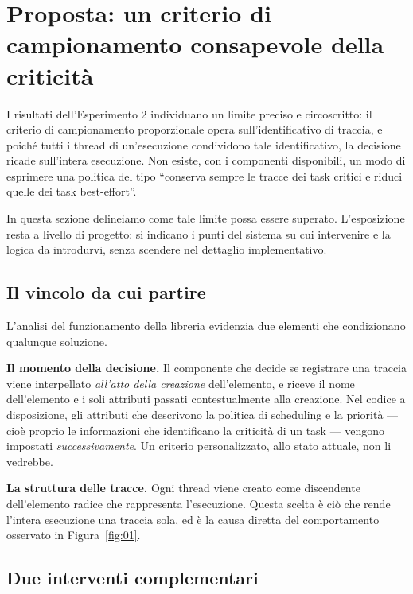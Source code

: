
\section{Proposta: un criterio di campionamento consapevole della criticit\`a}

I risultati dell'Esperimento 2 individuano un limite preciso e circoscritto: il criterio di
campionamento proporzionale opera sull'identificativo di traccia, e poich\'e tutti i thread di
un'esecuzione condividono tale identificativo, la decisione ricade sull'intera esecuzione. Non
esiste, con i componenti disponibili, un modo di esprimere una politica del tipo ``conserva sempre
le tracce dei task critici e riduci quelle dei task best-effort''.

In questa sezione delineiamo come tale limite possa essere superato. L'esposizione resta a livello
di progetto: si indicano i punti del sistema su cui intervenire e la logica da introdurvi, senza
scendere nel dettaglio implementativo.

\subsection{Il vincolo da cui partire}

L'analisi del funzionamento della libreria evidenzia due elementi che condizionano qualunque
soluzione.

\textbf{Il momento della decisione.} Il componente che decide se registrare una traccia viene
interpellato \emph{all'atto della creazione} dell'elemento, e riceve il nome dell'elemento e i soli
attributi passati contestualmente alla creazione. Nel codice a disposizione, gli attributi che
descrivono la politica di scheduling e la priorit\`a --- cio\`e proprio le informazioni che
identificano la criticit\`a di un task --- vengono impostati \emph{successivamente}. Un criterio
personalizzato, allo stato attuale, non li vedrebbe.

\textbf{La struttura delle tracce.} Ogni thread viene creato come discendente dell'elemento radice
che rappresenta l'esecuzione. Questa scelta \`e ci\`o che rende l'intera esecuzione una traccia sola,
ed \`e la causa diretta del comportamento osservato in Figura~\ref{fig:01}.

\subsection{Due interventi complementari}

